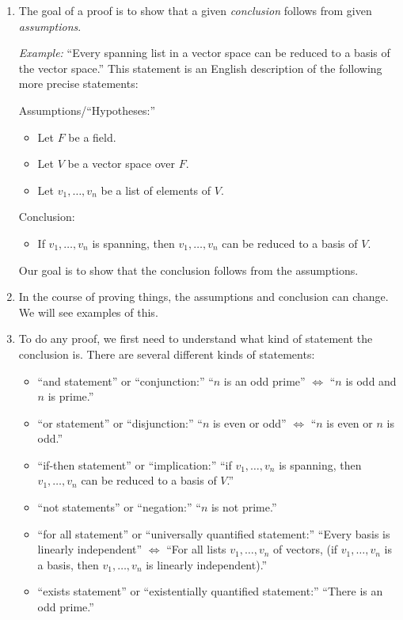 \documentclass[11pt]{article}
\begin{document}
    \begin{enumerate}
        \item The goal of a proof is to show that a given \emph{conclusion} follows from given \emph{assumptions}.
        
        \vspace{1em}

        \emph{Example:} ``Every spanning list in a vector space can be reduced to a basis of the vector space.'' This statement is an English description of the following more precise statements:

        Assumptions/``Hypotheses:''

        \begin{itemize}
            \item Let $F$ be a field.
            \item Let $V$ be a vector space over $F$.
            \item Let \(v_1, \dots, v_n\) be a list of elements of $V$.
        \end{itemize}

        Conclusion:

        \begin{itemize}
            \item If \(v_1, \dots, v_n\) is spanning, then \(v_1, \dots, v_n\) can be reduced to a basis of $V$.
        \end{itemize}

        Our goal is to show that the conclusion follows from the assumptions.

        \item In the course of proving things, the assumptions and conclusion can change. We will see examples of this.
        \item To do any proof, we first need to understand what kind of statement the conclusion is. There are several different kinds of statements:
        \begin{itemize}
            \item ``and statement'' or ``conjunction:'' ``$n$ is an odd prime'' \(\Leftrightarrow\) ``$n$ is odd and $n$ is prime.''
            \item ``or statement'' or ``disjunction:'' ``$n$ is even or odd'' \(\Leftrightarrow\) ``$n$ is even or $n$ is odd.''
            \item ``if-then statement'' or ``implication:'' ``if \(v_1, \dots, v_n\) is spanning, then \(v_1, \dots, v_n\) can be reduced to a basis of $V$.''
            \item ``not statements'' or ``negation:'' ``$n$ is not prime.''
            \item ``for all statement'' or ``universally quantified statement:'' ``Every basis is linearly independent'' \(\Leftrightarrow\) ``For all lists \(v_1, \dots, v_n\) of vectors, (if \(v_1, \dots, v_n\) is a basis, then \(v_1, \dots, v_n\) is linearly independent).''
            \item ``exists statement'' or ``existentially quantified statement:'' ``There is an odd prime.''
        \end{itemize}


\end{enumerate}
\end{document}
